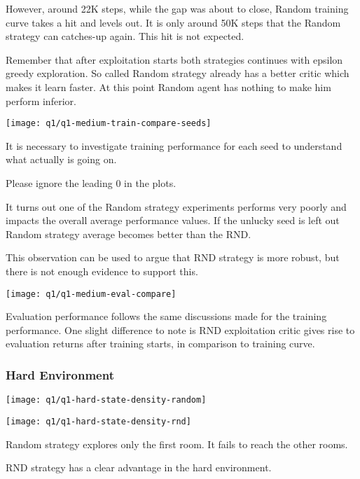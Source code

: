 \documentclass[11pt]{article}
\begin{document}
    However, around 22K steps, while the gap was about to close, Random training curve takes a hit and levels out.
    It is only around 50K steps that the Random strategy can catches-up again.
    This hit is not expected.

    Remember that after exploitation starts both strategies continues with epsilon greedy exploration.
    So called Random strategy already has a better critic which makes it learn faster.
    At this point Random agent has nothing to make him perform inferior.

    \hspace*{-0.6in}
    \texttt{[image: q1/q1-medium-train-compare-seeds]}

    It is necessary to investigate training performance for each seed to understand what actually is going on.

    Please ignore the leading 0 in the plots.

    It turns out one of the Random strategy experiments performs very poorly and impacts the overall average performance values.
    If the unlucky seed is left out Random strategy average becomes better than the RND.

    This observation can be used to argue that RND strategy is more robust, but there is not enough evidence to support this.

    \hspace*{-0.6in}
    \texttt{[image: q1/q1-medium-eval-compare]}

    Evaluation performance follows the same discussions made for the training performance.
    One slight difference to note is RND exploitation critic gives rise to evaluation returns after training starts, in comparison to training curve.

    \subsubsection*{Hard Environment}

    \hspace*{-0.6in}
    \texttt{[image: q1/q1-hard-state-density-random]}

    \hspace*{-0.6in}
    \texttt{[image: q1/q1-hard-state-density-rnd]}

    Random strategy explores only the first room.
    It fails to reach the other rooms.

    RND strategy has a clear advantage in the hard environment.
\end{document}
